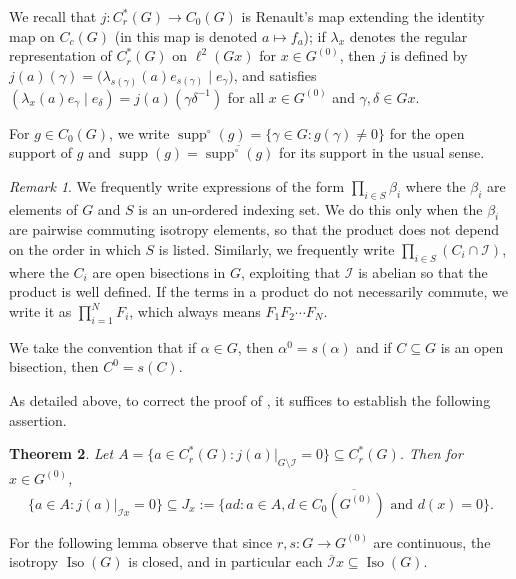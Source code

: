 \documentclass[a4paper, 12pt]{amsart}
\theoremstyle{plain}
\newtheorem{theorem}{Theorem}[section]
\theoremstyle{definition}
\theoremstyle{remark}
\newtheorem{remark}[theorem]{Remark}
\newcommand{\Iso}{\operatorname{Iso}}
\newcommand{\supp}{\operatorname{supp}}
\newcommand{\Ii}{\mathcal{I}}
\newcommand{\Iicl}{\overline{\mathcal{I}}}
\numberwithin{equation}{section}
\begin{document}
We recall that $j \colon C^*_r(G) \to C_0(G)$ is Renault's map extending the
identity map on $C_c(G)$ \cite[Proposition~II.4.2]{Renault} (in \cite{CRST}
this map is denoted $a \mapsto f_a$); if $\lambda_x$ denotes the regular
representation of $C^*_r(G)$ on $\ell^2(Gx)$ for $x \in G^{(0)}$, then $j$ is
defined by $j(a)(\gamma) = \big(\lambda_{s(\gamma)}(a) e_{s(\gamma)} \mid
e_\gamma)$, and satisfies $(\lambda_x(a) e_\gamma \mid e_\delta) =
j(a)(\gamma\delta^{-1})$ for all $x \in G^{(0)}$ and $\gamma,\delta \in Gx$.

For $g \in C_0(G)$, we write $\supp^\circ(g) = \{\gamma \in G : g(\gamma) \not=
0\}$ for the open support of $g$ and $\supp(g) = \overline{\supp^\circ(g)}$ for
its support in the usual sense.

\begin{remark}\label{rmk:products}
We frequently write expressions of the form $\prod_{i \in S} \beta_i$ where
the $\beta_i$ are elements of $G$ and $S$ is an un-ordered indexing set. We
do this only when the $\beta_i$ are pairwise commuting isotropy elements, so
that the product does not depend on the order in which $S$ is listed.
Similarly, we frequently write $\prod_{i \in S} (C_i \cap \Ii)$, where the
$C_i$ are open bisections in $G$, exploiting that $\Ii$ is abelian so that
the product is well defined. If the terms in a product do not necessarily
commute, we write it as $\prod^N_{i=1} F_i$, which always means $F_1 F_2
\cdots F_N$.
\end{remark}

We take the convention that if $\alpha \in G$, then $\alpha^0 =
s(\alpha)$ and if $C \subseteq G$ is an open bisection, then $C^0 = s(C)$.

As detailed above, to correct the proof of \cite[Lemma~5.2]{CRST}, it suffices to establish the
following assertion.

\begin{theorem}\label{thm:phew!}
Let $A = \{a \in C^*_r(G) : j(a)|_{G \setminus \Ii} = 0\} \subseteq C^*_r(G)$. Then for $x \in G^{(0)}$,
\[
\{a \in A : j(a)|_{\Ii x} = 0\} \subseteq J_x := \overline{\{ad : a \in A, d \in
C_0(G^{(0)})\text{ and }d(x) = 0\}}.
\]
\end{theorem}

For the following lemma observe that since $r, s \colon G \to G^{(0)}$ are
continuous, the isotropy $\Iso(G)$ is closed, and in particular each $\Iicl x
\subseteq \Iso(G)$.
\end{document}

